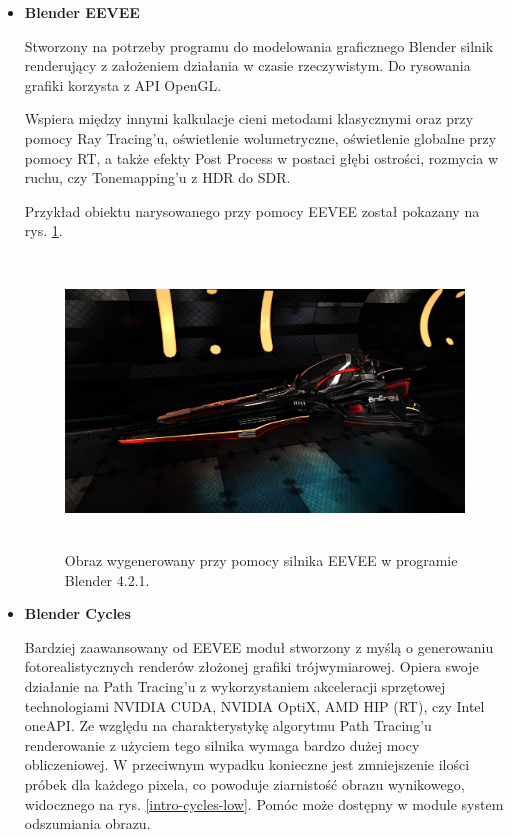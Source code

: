 \begin{itemize}
	\item \textbf{Blender EEVEE}

	Stworzony na potrzeby programu do modelowania graficznego Blender silnik renderujący z założeniem działania w czasie rzeczywistym. Do rysowania grafiki korzysta z API OpenGL.

	Wspiera między innymi kalkulacje cieni metodami klasycznymi oraz przy pomocy Ray Tracing'u, oświetlenie wolumetryczne, oświetlenie globalne przy pomocy RT, a także efekty Post Process w postaci głębi ostrości, rozmycia w ruchu, czy Tonemapping'u z HDR do SDR.

	Przykład obiektu narysowanego przy pomocy EEVEE został pokazany na rys. \ref{intro-eevee}.

	\begin{figure}[htbp]
		\centering
		\includegraphics[width=5.41667in,height=3.03651in]{images/14_eevee.png}
		\caption{Obraz wygenerowany przy pomocy silnika EEVEE w programie Blender 4.2.1.}
		\label{intro-eevee}
	\end{figure}

	\item \textbf{Blender Cycles}

	Bardziej zaawansowany od EEVEE moduł stworzony z myślą o generowaniu fotorealistycznych renderów złożonej grafiki trójwymiarowej. Opiera swoje działanie na Path Tracing'u z wykorzystaniem akceleracji sprzętowej technologiami NVIDIA CUDA, NVIDIA OptiX, AMD HIP (RT), czy Intel oneAPI. Ze względu na charakterystykę algorytmu Path Tracing'u renderowanie z użyciem tego silnika wymaga bardzo dużej mocy obliczeniowej. W przeciwnym wypadku konieczne jest zmniejszenie ilości próbek dla każdego pixela, co powoduje ziarnistość obrazu wynikowego, widocznego na rys. \ref{intro-cycles-low}. Pomóc może dostępny w module system odszumiania obrazu.


\end{itemize}
